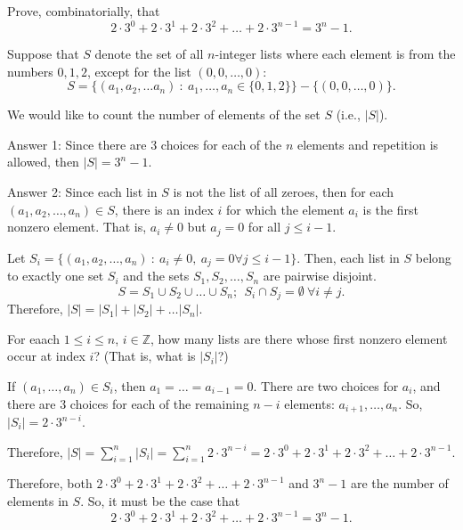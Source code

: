 \documentclass{article}
\newcommand{\Z}{\mathbb{Z}}
\theoremstyle{definition}
\begin{document}
\begin{question}
    Prove, combinatorially, that
    \[ 2 \cdot 3^0 + 2 \cdot 3^1 + 2 \cdot 3^2 + \ldots + 2 \cdot 3^{n-1} = 3^n - 1. \]
\end{question}
\begin{solution}
Suppose that $S$ denote the set of all $n$-integer lists where each element is from the numbers $0, 1, 2$, except for the list $(0, 0, \ldots, 0)$:
\[ S = \{ (a_1, a_2, \ldots a_n) ~:~ a_1, \ldots, a_n \in \{0, 1, 2\} \} - \{ (0, 0, \ldots, 0) \}. \]

We would like to count the number of elements of the set $S$ (i.e., $|S|$).

Answer 1: Since there are 3 choices for each of the $n$ elements and repetition is allowed, then $|S| = 3^n - 1$.

Answer 2: Since each list in $S$ is not the list of all zeroes, then for each $(a_1, a_2, \ldots, a_n) \in S$, there is an index $i$ for which the element $a_i$ is the first nonzero element.  That is, $a_i \neq 0$ but $a_j = 0$ for all $j \leq i-1$.

Let $S_i = \{(a_1, a_2, \ldots, a_n) ~:~ a_i \neq 0, ~ a_j = 0 \forall j \leq i-1\}$.  Then, each list in $S$ belong to exactly one set $S_i$
and the sets $S_1, S_2, \ldots, S_n$ are pairwise disjoint.
\[ S = S_1 \cup S_2 \cup \ldots \cup S_n; ~~ S_i \cap S_j = \emptyset \ \forall i \neq j.\]  
Therefore, $|S| = |S_1| + |S_2| + \ldots |S_n|$.

For eaach $1 \leq i \leq n$, $i\in \Z$, how many lists are there whose first nonzero element occur at index $i$?  (That is, what is $|S_i|$?)  

If $(a_1, \ldots, a_n) \in S_i$, then $a_1 = \ldots = a_{i-1} = 0$.  There are two choices for $a_i$, and there are 3 choices for each of the remaining $n-i$ elements: $a_{i+1}, \ldots, a_n$.  So, $|S_i| = 2 \cdot 3^{n-i}$.

Therefore, $|S| = \displaystyle\sum_{i=1}^n |S_i| = \sum_{i=1}^n 2\cdot 3^{n-i} = 2 \cdot 3^0 + 2 \cdot 3^1 + 2 \cdot 3^2 + \ldots + 2 \cdot 3^{n-1}$.

Therefore, both $2 \cdot 3^0 + 2 \cdot 3^1 + 2 \cdot 3^2 + \ldots + 2 \cdot 3^{n-1}$ and $3^n-1$ are the number of elements in $S$.  So, it must be the case that
\[2 \cdot 3^0 + 2 \cdot 3^1 + 2 \cdot 3^2 + \ldots + 2 \cdot 3^{n-1} = 3^n - 1. \]
\end{solution}
\end{document}

